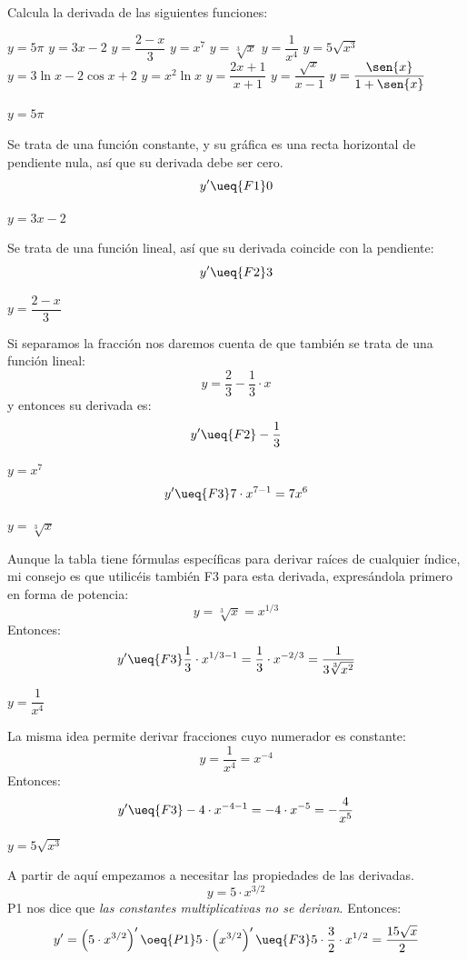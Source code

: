 \begin{ejemplo}{
Calcula la derivada de las siguientes funciones:
\begin{apartados}
    \ap $y=5\pi$
    \ap $y=3x-2$
    \ap $y=\dfrac{2-x}3$
    \ap $y=x^7$
    \ap $y=\sqrt[3]{x}$
    \ap $y=\dfrac1{x^4}$
    \ap $y=5\sqrt{x^3}$
    \ap $y=3\ln{x}-2\cos{x}+2$
    \ap $y=x^2\ln{x}$
    \ap $y=\dfrac{2x+1}{x+1}$
    \ap $y=\dfrac{\sqrt{x}}{x-1}$
    \ap $y=\dfrac{\sen{x}}{1+\sen{x}}$
\end{apartados}
}
\quad $y=5\pi$

\vspace{2mm}Se trata de una función constante, y su gráfica es una recta horizontal de pendiente nula, así que su derivada debe ser cero.
\[y'\ueq{F1}0\]

\quad $y=3x-2$

\vspace{2mm}Se trata de una función lineal, así que su derivada coincide con la pendiente:
\[y'\ueq{F2}3\]

\quad $y=\dfrac{2-x}3$

\vspace{2mm}Si separamos la fracción nos daremos cuenta de que también se trata de una función lineal:
\[y=\dfrac23-\dfrac13\cdot x\]
y entonces su derivada es:
\[y'\ueq{F2}-\dfrac13\]

\quad $y=x^7$
\[y'\ueq{F3}7\cdot x^{7-1}=7x^6\]

\quad $y=\sqrt[3]{x}$

Aunque la tabla tiene fórmulas específicas para derivar raíces de cualquier índice, mi consejo es que utilicéis también F3 para esta derivada, expresándola primero en forma de potencia:
\[y=\sqrt[3]{x}=x^{1/3}\]
Entonces:
\[y'\ueq{F3}\frac13\cdot x^{1/3-1}=\frac13\cdot x^{-2/3}=\frac1{3\sqrt[3]{x^2}}\]

\quad $y=\dfrac1{x^4}$

La misma idea permite derivar fracciones cuyo numerador es constante:
\[y=\frac1{x^4}=x^{-4}\]
Entonces:
\[y'\ueq{F3}-4\cdot x^{-4-1}=-4\cdot x^{-5}=-\frac4{x^5}\]

\quad $y=5\sqrt{x^3}$

A partir de aquí empezamos a necesitar las propiedades de las derivadas.
\[y=5\cdot x^{3/2}\]
 P1 nos dice que \emph{las constantes multiplicativas no se derivan}. Entonces:
\[y'=\left(5\cdot x^{3/2}\right)'\oeq{P1}
    5\cdot\left(x^{3/2}\right)'\ueq{F3}
    5\cdot\frac32\cdot x^{1/2}=\frac{15\sqrt{x}}2
\]


\end{ejemplo}
